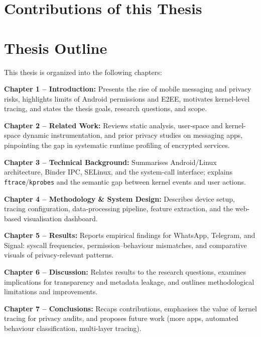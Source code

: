 \documentclass[a4paper,12pt]{report}
\begin{document}
\section{Contributions of this Thesis}

\section{Thesis Outline}
This thesis is organized into the following chapters:

\textbf{Chapter 1 – Introduction:} Presents the rise of mobile messaging and privacy risks, highlights limits of Android permissions and E2EE, motivates kernel-level tracing, and states the thesis goals, research questions, and scope.

\vspace{0.4em}
\textbf{Chapter 2 – Related Work:} Reviews static analysis, user-space and kernel-space dynamic instrumentation, and prior privacy studies on messaging apps, pinpointing the gap in systematic runtime profiling of encrypted services.

\vspace{0.4em}
\textbf{Chapter 3 – Technical Background:} Summarises Android/Linux architecture, Binder IPC, SELinux, and the system-call interface; explains \texttt{ftrace}/\texttt{kprobes} and the semantic gap between kernel events and user actions.

\vspace{0.4em}
\textbf{Chapter 4 – Methodology \& System Design:} Describes device setup, tracing configuration, data-processing pipeline, feature extraction, and the web-based visualisation dashboard.

\vspace{0.4em}
\textbf{Chapter 5 – Results:} Reports empirical findings for WhatsApp, Telegram, and Signal: syscall frequencies, permission–behaviour mismatches, and comparative visuals of privacy-relevant patterns.

\vspace{0.4em}
\textbf{Chapter 6 – Discussion:} Relates results to the research questions, examines implications for transparency and metadata leakage, and outlines methodological limitations and improvements.

\vspace{0.4em}
\textbf{Chapter 7 – Conclusions:} Recaps contributions, emphasises the value of kernel tracing for privacy audits, and proposes future work (more apps, automated behaviour classification, multi-layer tracing).
\end{document}
